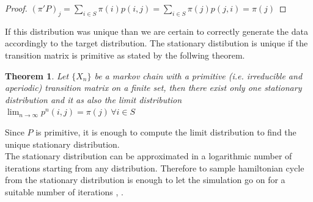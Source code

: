 \documentclass{article}
\newtheorem{theorem}{Theorem}
\begin{document}
\begin{proof}
$ (\pi'P)_j = \sum_{i \in S} \pi(i)p(i,j) = \sum_{i \in S} \pi(j)p(j,i) = \pi(j) $ 
\end{proof}
\noindent If this distribution was unique than we are certain to correctly generate the data accordingly to the target distribution. The stationary distibution is unique if the transition matrix is primitive as stated by the follwing theorem.
\begin{theorem}
Let $\{X_n\}$ be a markov chain with a primitive (i.e. irreducible and aperiodic) transition matrix on a finite set, then  there exist only one stationary distribution and it as also the limit distribution $\lim_{n \to \infty} p^n(i,j) = \pi(j)\,  \forall i \in S$
\end{theorem}
\noindent Since $P$ is primitive, it is enough to compute the limit distribution to find the unique stationary distribution. \\
The stationary distribution can be approximated in a logarithmic number of iterations starting from any distribution. Therefore to sample hamiltonian cycle from the stationary distribution is enough to let the simulation go on for a suitable number of iterations \cite{mctheory}, \cite{mcalgorithm}. \\
\end{document}
